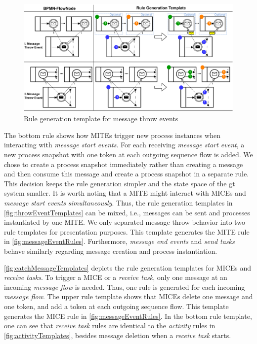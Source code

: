 \documentclass[runningheads]{llncs}
\begin{document}
\begin{figure}[ht]
    \centering
    \includegraphics[width=1\textwidth]{images/throw_messages.pdf}
    \caption{Rule generation template for message throw events}
    \label{fig:throwEventTemplates}
\end{figure}

The bottom rule shows how MITEs trigger new process instances when interacting with \textit{message start events}.
For each receiving \textit{message start event}, a new process snapshot with one token at each outgoing sequence flow is added.
We chose to create a process snapshot immediately rather than creating a message and then consume this message and create a process snapshot in a separate rule.
This decision keeps the rule generation simpler and the state space of the \gls*{gt} system smaller.
It is worth noting that a MITE might interact with MICEs and \textit{message start events} \textit{simultaneously}.
Thus, the rule generation templates in \autoref{fig:throwEventTemplates} can be mixed, i.e., messages can be sent and processes instantiated by one MITE.
We only separated message throw behavior into two rule templates for presentation purposes.
This template generates the MITE rule in \autoref{fig:messageEventRules}.
Furthermore, \textit{message end events} and \textit{send tasks} behave similarly regarding message creation and process instantiation.

\autoref{fig:catchMessageTemplates} depicts the rule generation templates for MICEs and \textit{receive tasks}.
To trigger a MICE or a \textit{receive task}, only one message at an incoming \textit{message flow} is needed.
Thus, one rule is generated for each incoming \textit{message flow}.
The upper rule template shows that MICEs delete one message and one token, and add a token at each outgoing sequence flow.
This template generates the MICE rule in \autoref{fig:messageEventRules}.
In the bottom rule template, one can see that \textit{receive task} rules are identical to the \textit{activity} rules in \autoref{fig:activityTemplates},  besides message deletion when a \textit{receive task} starts.
\end{document}
